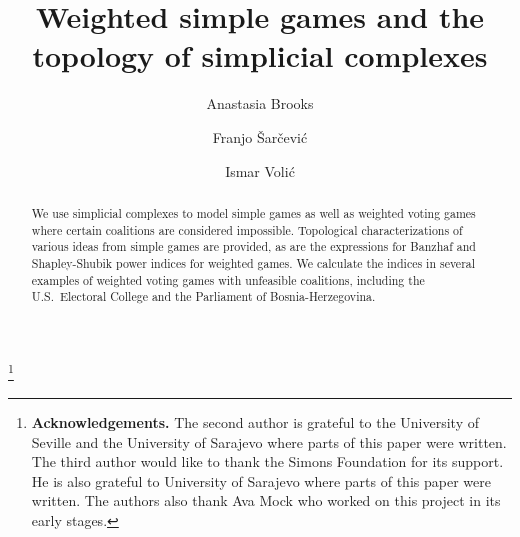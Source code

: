 \documentclass[11pt]{amsart}
\theoremstyle{plain}
\theoremstyle{definition}
\theoremstyle{remark}
\begin{document}
\title{Weighted simple games and the topology of simplicial complexes}


\author{Anastasia Brooks}
\address{Department of Mathematics, Wellesley College, Wellesley, MA}

\author{Franjo \v Sar\v cevi\'c}
\address{Faculty of Civil Engineering, University of Rijeka, Croatia}

\author{Ismar Voli\'c}
\address{Department of Mathematics, Wellesley College, Wellesley, MA}



\thanks{\textbf{Acknowledgements.} The second author is grateful to the University of Seville and the University of Sarajevo where parts of this paper were written. The third author would like to thank the Simons Foundation for its support. He is also grateful to University of Sarajevo where parts of this paper were written. The authors also thank Ava Mock who worked on this project in its early stages.}

\begin{abstract}
We use simplicial complexes to model simple games as well as weighted voting games where certain coalitions are considered impossible. Topological characterizations of various ideas from simple games are provided, as are the expressions for Banzhaf and Shapley-Shubik power indices for weighted games. We calculate the indices in several examples of weighted voting games with unfeasible coalitions, including the U.S.~Electoral College and the Parliament of Bosnia-Herzegovina.
\end{abstract}

\maketitle




\end{document}
